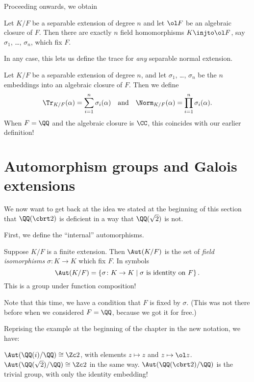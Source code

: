 Proceeding onwards, we obtain
\begin{theorem}
	Let $K/F$ be a separable extension of degree $n$
	and let $\ol F$ be an algebraic closure of $F$.
	Then there are exactly $n$ field homomorphisms $K \injto \ol F$,
	say $\sigma_1$, \dots, $\sigma_n$, which fix $F$.
\end{theorem}

In any case, this lets us define the trace for \emph{any} separable normal extension.
\begin{definition}
Let $K/F$ be a separable extension of degree $n$, and let $\sigma_1$, \dots, $\sigma_n$
be the $n$ embeddings into an algebraic closure of $F$. Then we define
\[
	\Tr_{K/F}(\alpha) = \sum_{i=1}^n \sigma_i(\alpha)
	\quad\text{and}\quad
	\Norm_{K/F}(\alpha) = \prod_{i=1}^n \sigma_i(\alpha).
\]
When $F = \QQ$ and the algebraic closure is $\CC$, this coincides with our earlier definition!
\end{definition}

\section{Automorphism groups and Galois extensions}
We now want to get back at the idea we stated at the beginning of
this section that $\QQ(\cbrt 2)$ is deficient in a way that $\QQ(\sqrt 2)$ is not.

First, we define the ``internal'' automorphisms.
\begin{definition}
	Suppose $K/F$ is a finite extension.
	Then $\Aut(K/F)$ is the set of \emph{field isomorphisms} $\sigma \colon K \to K$ which fix $F$.
	In symbols
	\[ \Aut(K/F) =
		\left\{ \sigma \colon K \to K \mid \text{$\sigma$ is identity on $F$} \right\}. \]
	This is a group under function composition!
\end{definition}
Note that this time, we have a condition that $F$ is fixed by $\sigma$.
(This was not there before when we considered $F = \QQ$, because we got it for free.)

\begin{example}
	Reprising the example at the beginning of the chapter in the new notation, we have:
	\begin{enumerate}[(a)]
		\ii $\Aut(\QQ(i) / \QQ) \cong \Zc 2$, with elements $z \mapsto z$ and $z \mapsto \ol z$.
		\ii $\Aut(\QQ(\sqrt 2) / \QQ) \cong \Zc 2$ in the same way.
		\ii $\Aut(\QQ(\cbrt 2) / \QQ)$ is the trivial group, with only the identity embedding!
	\end{enumerate}
\end{example}

